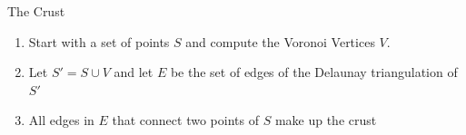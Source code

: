 \begin{frame}{The Crust}
	\begin{enumerate}
		\item Start with a set of points $S$ and compute the Voronoi Vertices $V$.
		\item Let $S'=S\cup V$ and let $E$ be the set of edges of the Delaunay triangulation of $S'$
		\item All edges in $E$ that connect two points of $S$ make up the crust
	\end{enumerate}
	
\end{frame}
